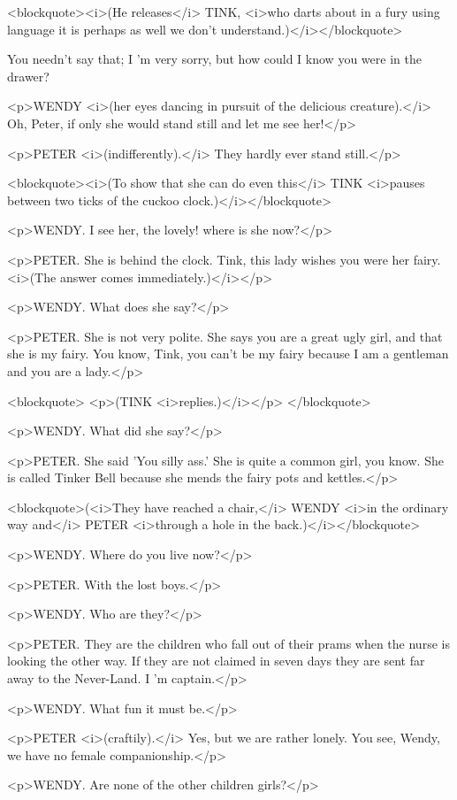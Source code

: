 <blockquote><i>(He releases</i> TINK, <i>who darts about in a fury using language it is perhaps as well we don't understand.)</i></blockquote>

You needn't say that; I 'm very sorry, but how could I know you were in the drawer? 

<p>WENDY <i>(her eyes dancing in pursuit of the delicious creature).</i> Oh, Peter, if only she would stand still and let me see her!</p>

<p>PETER <i>(indifferently).</i> They hardly ever stand still.</p>

<blockquote><i>(To show that she can do even this</i> TINK <i>pauses between two ticks of the cuckoo clock.)</i></blockquote>

<p>WENDY. I see her, the lovely! where is she now?</p>

<p>PETER. She is behind the clock. Tink, this lady wishes you were her fairy. <i>(The answer comes immediately.)</i></p>

<p>WENDY. What does she say?</p>

<p>PETER. She is not very polite. She says you are a great ugly girl, and that she is my fairy. You know, Tink, you can't be my fairy because I am a gentleman and you are a lady.</p>

<blockquote> <p>(TINK <i>replies.)</i></p> </blockquote>

<p>WENDY. What did she say?</p>

<p>PETER. She said 'You silly ass.' She is quite a common girl, you know. She is called Tinker Bell because she mends the fairy pots and kettles.</p>

<blockquote>(<i>They have reached a chair,</i> WENDY <i>in the ordinary way and</i> PETER <i>through a hole in the back.)</i></blockquote>

<p>WENDY. Where do you live now?</p>

<p>PETER. With the lost boys.</p>

<p>WENDY. Who are they?</p>

<p>PETER. They are the children who fall out of their prams when the nurse is looking the other way. If they are not claimed in seven days they are sent far away to the Never-Land. I 'm captain.</p>

<p>WENDY. What fun it must be.</p>

<p>PETER <i>(craftily).</i> Yes, but we are rather lonely. You see, Wendy, we have no female companionship.</p>

<p>WENDY. Are none of the other children girls?</p>


